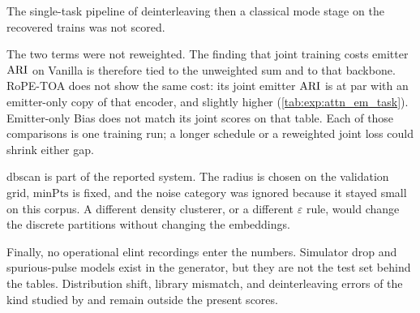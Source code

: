 The single-task pipeline of deinterleaving then a classical mode stage on the recovered trains was not scored.

The two terms were not reweighted.
The finding that joint training costs emitter $\mathrm{ARI}$ on Vanilla is therefore tied to the unweighted sum and to that backbone.
RoPE-TOA does not show the same cost: its joint emitter $\mathrm{ARI}$ is at par with an emitter-only copy of that encoder, and slightly higher (\cref{tab:exp:attn_em_task}).
Emitter-only Bias does not match its joint scores on that table.
Each of those comparisons is one training run; a longer schedule or a reweighted joint loss could shrink either gap.

\Gls{dbscan} is part of the reported system.
The radius is chosen on the validation grid, $\mathrm{minPts}$ is fixed, and the noise category was ignored because it stayed small on this corpus.
A different density clusterer, or a different $\varepsilon$ rule, would change the discrete partitions without changing the embeddings.

Finally, no operational \gls{elint} recordings enter the numbers.
Simulator drop and spurious-pulse models exist in the generator, but they are not the test set behind the tables.
Distribution shift, library mismatch, and deinterleaving errors of the kind studied by \textcite{jakobsson2024trackassociation} and \textcite{coleman2023rwrdrift} remain outside the present scores.
